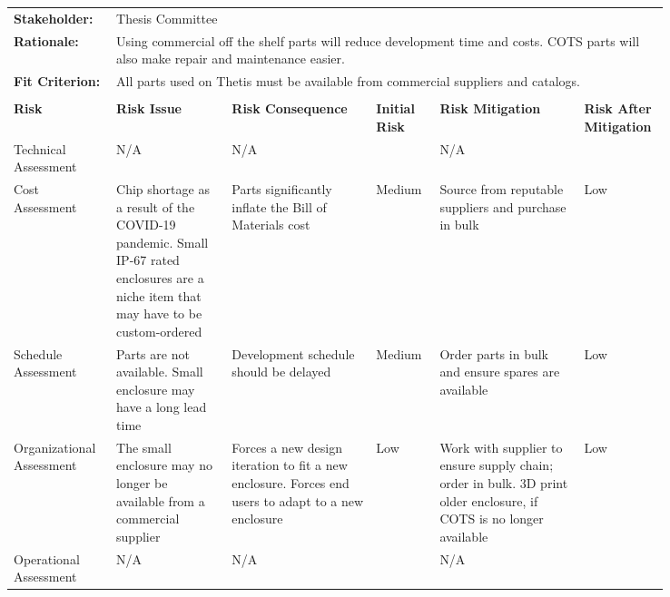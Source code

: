 \begin{landscape}
{\begin{longtable}{| p{0.12\linewidth} | p{0.16\linewidth} |  p{0.20\linewidth} | p{0.08\linewidth} | p{0.20\linewidth} | p{0.08\linewidth} |}
	\hline
	\rowcolor[gray]{0.8}
	\multicolumn{6}{|c|}{ } \\
	\hline
	\textbf{Stakeholder:} & \multicolumn{5}{|l|}{Thesis Committee} \\
	\hline
	\textbf{Rationale:} & \multicolumn{5}{|p{0.8\linewidth}|}{Using commercial off the shelf parts will reduce development time and costs. COTS parts will also make repair and maintenance easier.} \\
	\hline
	\textbf{Fit Criterion:} & \multicolumn{5}{|p{0.8\linewidth}|}{All parts used on Thetis must be available from commercial suppliers and catalogs.} \\
	\hline
	\rowcolor[gray]{0.8}
	\multicolumn{6}{|c|}{ } \\
	\hline
	\textbf{Risk} & \textbf{Risk Issue} & \textbf{Risk Consequence} & \textbf{Initial Risk} & \textbf{Risk Mitigation} & \textbf{Risk \newline After \newline Mitigation} \\
	\hline
	Technical \newline Assessment & N/A & N/A & \cellcolor[gray]{0.8} & N/A & \cellcolor[gray]{0.8} \\
	\hline
	Cost \newline Assessment & Chip shortage as a result of the COVID-19 pandemic. \newline Small IP-67 rated enclosures are a niche item that may have to be custom-ordered & Parts significantly inflate the Bill of Materials cost & \cellcolor{yellow} Medium & Source from reputable suppliers and purchase in bulk & \cellcolor{green} Low \\
	\hline
	Schedule \newline Assessment & Parts are not available. \newline Small enclosure may have a long lead time & Development schedule should be delayed & \cellcolor{yellow} Medium & Order parts in bulk and ensure spares are available & \cellcolor{green} Low \\
	\hline
	Organizational \newline Assessment & The small enclosure may no longer be available from a commercial supplier & Forces a new design iteration to fit a new enclosure. \newline Forces end users to adapt to a new enclosure & \cellcolor{green} Low & Work with supplier to ensure supply chain; order in bulk. \newline 3D print older enclosure, if COTS is no longer available & \cellcolor{green} Low \\
	\hline
	Operational \newline Assessment & N/A & N/A & \cellcolor[gray]{0.8} & N/A & \cellcolor[gray]{0.8}
	\label{tab:sr05_feasibility}
\end{longtable}
}
\newpage



\end{landscape}
